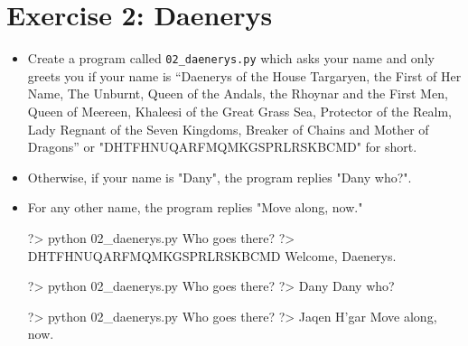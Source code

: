 \documentclass{42-en}
\begin{document}
\nextexercice
\newpage

\chapter{Exercise 2: Daenerys}
\makeheaderfiles

\begin{itemize}

\item Create a program called \texttt{02\_daenerys.py} which asks your name and only greets you if your name is “Daenerys of the House Targaryen, the First of Her Name, The Unburnt, Queen of the Andals, the Rhoynar and the First Men, Queen of Meereen, Khaleesi of the Great Grass Sea, Protector of the Realm, Lady Regnant of the Seven Kingdoms, Breaker of Chains and Mother of Dragons” or "DHTFHNUQARFMQMKGSPRLRSKBCMD" for short.
\item Otherwise, if your name is "Dany", the program replies "Dany who?".
\item For any other name, the program replies "Move along, now."

\begin{42console}
	?> python 02_daenerys.py
	Who goes there?
	?> DHTFHNUQARFMQMKGSPRLRSKBCMD
	Welcome, Daenerys.
\end{42console}

\begin{42console}
	?> python 02_daenerys.py
	Who goes there?
	?> Dany
	Dany who?
\end{42console}

\begin{42console}
	?> python 02_daenerys.py
	Who goes there?
	?> Jaqen H'gar
	Move along, now.
\end{42console}

\end{itemize}
\end{document}
